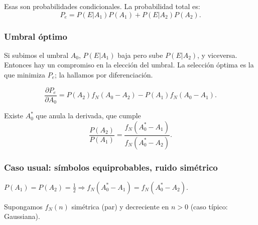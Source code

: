 \begin{figure}[htb]
    \centering\begin{minipage}{\textwidth}
    \endpgfgraphicnamed\end{minipage}
\end{figure}
\FloatBarrier

Esas son probabilidades condicionales. La probabilidad total es:
\[P_e = P(E|A_1) P (A_1) + P(E|A_2) P (A_2).\]

\subsubsection*{Umbral óptimo}

Si subimos el umbral $A_0$, $P(E|A_1)$ baja pero sube $P(E|A_2)$,
y viceversa. Entonces hay un compromiso en la elección del umbral.
La selección óptima es la que minimiza $P_e$; la hallamos por
diferenciación.

\[\frac{\partial P_e}{\partial A_0} = P(A_2) f_N(A_0 - A_2) - P(A_1) f_N (A_0 - A_1).\]

Existe $A_0^*$ que anula la derivada, que cumple
\[\frac{P(A_2)}{P(A_1)}=\frac{f_N(A_0^*-A_1)}{f_N(A_0^*-A_2)}.\]

\subsubsection*{Caso usual: símbolos equiprobables, ruido simétrico}

$P(A_1) = P(A_2) = \frac{1}{2}\Rightarrow f_N(A_0^*-A_1) =
f_N(A_0^*-A_2)$.

Supongamos $f_N(n)$ simétrica (par) y decreciente en $n>0$ (caso típico: Gaussiana).

